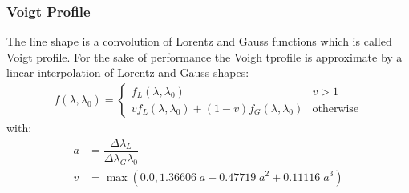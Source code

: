 \subsubsection{Voigt Profile}

The line shape is a convolution of Lorentz and Gauss functions which is called Voigt profile. For the sake of performance the Voigh tprofile is approximate by a linear interpolation of Lorentz and Gauss shapes:
\begin{align}
	f(\lambda, \lambda_0) =
	\begin{cases}
		f_L(\lambda, \lambda_0) & v > 1\\
		v f_L(\lambda, \lambda_0) + (1-v) f_G(\lambda, \lambda_0) & \text{otherwise}
	\end{cases}
\end{align}
with:
\begin{align*}
	a &= \dfrac{\Delta \lambda_L}{\Delta \lambda_G \lambda_0} \\
	v &= \operatorname{max}(0.0, 1.36606 \; a - 0.47719 \; a^2 + 0.11116 \;  a^3)
\end{align*}



